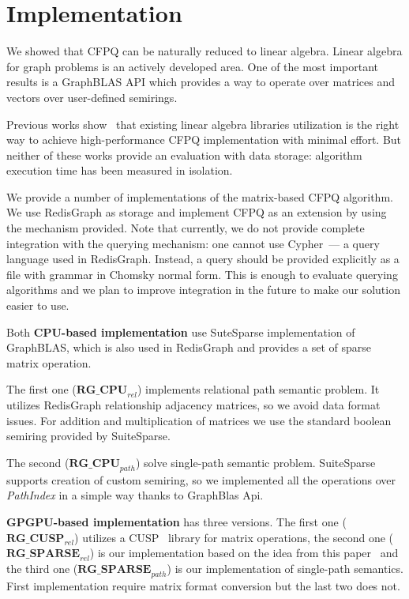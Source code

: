 \section{Implementation}

We showed that CFPQ can be naturally reduced to linear algebra.
Linear algebra for graph problems is an actively developed area.
One of the most important results is a GraphBLAS API which provides a way to operate over matrices and vectors over user-defined semirings.

Previous works show~\cite{Mishin:2019:ECP:3327964.3328503, Azimov:2018:CPQ:3210259.3210264} that existing linear algebra libraries utilization is the right way to achieve high-performance CFPQ implementation with minimal effort.
But neither of these works provide an evaluation with data storage: algorithm execution time has been measured in isolation.

We provide a number of implementations of the matrix-based CFPQ algorithm.
We use RedisGraph as storage and implement CFPQ as an extension by using the mechanism provided.
Note that currently, we do not provide complete integration with the querying mechanism: one cannot use Cypher~--- a query language used in RedisGraph.
Instead, a query should be provided explicitly as a file with grammar in Chomsky normal form.
This is enough to evaluate querying algorithms and we plan to improve integration in the future to make our solution easier to use. 

Both \textbf{CPU-based implementation} use SuteSparse implementation of GraphBLAS, which is also used in RedisGraph and provides a set of sparse matrix operation.

The first one ($\textbf{RG\_CPU}_{rel}$) implements relational path semantic problem. It utilizes RedisGraph relationship adjacency matrices, so we avoid data format issues. For addition and multiplication of matrices we use the standard boolean semiring provided by SuiteSparse.

The second ($\textbf{RG\_CPU}_{path}$) solve single-path semantic problem. SuiteSparse supports creation of custom semiring, so we implemented all the operations over \textit{PathIndex} in a simple way thanks to GraphBlas Api.

\textbf{GPGPU-based implementation} has three versions.
The first one ($\textbf{RG\_CUSP}_{rel}$) utilizes a CUSP~\cite{Cusp} library for matrix operations, the second one ($\textbf{RG\_SPARSE}_{rel}$) is our implementation based on the idea from this paper~\cite{NsparsePaper} and the third one ($\textbf{RG\_SPARSE}_{path}$) is our implementation of single-path semantics.
First implementation require matrix format conversion but the last two does not.

